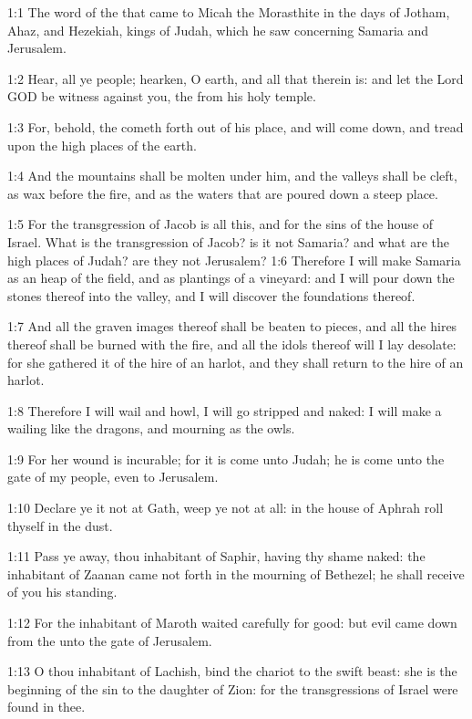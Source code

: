 

1:1 The word of the \LORD that came to Micah the Morasthite in the
days of Jotham, Ahaz, and Hezekiah, kings of Judah, which he saw
concerning Samaria and Jerusalem.

1:2 Hear, all ye people; hearken, O earth, and all that therein is:
and let the Lord GOD be witness against you, the \LORD from his holy
temple.

1:3 For, behold, the \LORD cometh forth out of his place, and will come
down, and tread upon the high places of the earth.

1:4 And the mountains shall be molten under him, and the valleys shall
be cleft, as wax before the fire, and as the waters that are poured
down a steep place.

1:5 For the transgression of Jacob is all this, and for the sins of
the house of Israel. What is the transgression of Jacob? is it not
Samaria? and what are the high places of Judah? are they not
Jerusalem?  1:6 Therefore I will make Samaria as an heap of the field,
and as plantings of a vineyard: and I will pour down the stones
thereof into the valley, and I will discover the foundations thereof.

1:7 And all the graven images thereof shall be beaten to pieces, and
all the hires thereof shall be burned with the fire, and all the idols
thereof will I lay desolate: for she gathered it of the hire of an
harlot, and they shall return to the hire of an harlot.

1:8 Therefore I will wail and howl, I will go stripped and naked: I
will make a wailing like the dragons, and mourning as the owls.

1:9 For her wound is incurable; for it is come unto Judah; he is come
unto the gate of my people, even to Jerusalem.

1:10 Declare ye it not at Gath, weep ye not at all: in the house of
Aphrah roll thyself in the dust.

1:11 Pass ye away, thou inhabitant of Saphir, having thy shame naked:
the inhabitant of Zaanan came not forth in the mourning of Bethezel;
he shall receive of you his standing.

1:12 For the inhabitant of Maroth waited carefully for good: but evil
came down from the \LORD unto the gate of Jerusalem.

1:13 O thou inhabitant of Lachish, bind the chariot to the swift
beast: she is the beginning of the sin to the daughter of Zion: for
the transgressions of Israel were found in thee.

